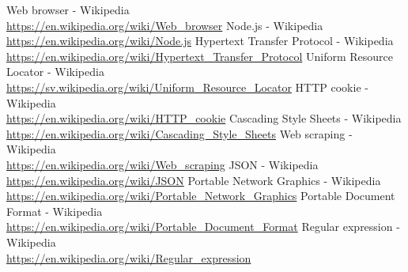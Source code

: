 \documentclass{article}
\begin{document}
	\newpage
	\renewcommand{\bibpreamble}{
		\textit{Because this type of project does not rely on the use of sources as basis for claims, instead discussing empirical observations using technical terms and concepts, little emphasis is put on the sources. In order to provide a reference, where information can be validated and reviewed, Wikipedia is used; the articles listed include all the relevant information. All sources were reviewed at the date of publication of this paper.}
	}
	
	\begin{thebibliography}{9}
		Web browser - Wikipedia\\\url{https://en.wikipedia.org/wiki/Web_browser}
		Node.js - Wikipedia\\\url{https://en.wikipedia.org/wiki/Node.js}
		Hypertext Transfer Protocol - Wikipedia\\\url{https://en.wikipedia.org/wiki/Hypertext_Transfer_Protocol}
		Uniform Resource Locator - Wikipedia\\\url{https://sv.wikipedia.org/wiki/Uniform_Resource_Locator}
		HTTP cookie - Wikipedia\\\url{https://en.wikipedia.org/wiki/HTTP_cookie}
		Cascading Style Sheets - Wikipedia\\\url{https://en.wikipedia.org/wiki/Cascading_Style_Sheets}
		Web scraping - Wikipedia\\\url{https://en.wikipedia.org/wiki/Web_scraping}
		JSON - Wikipedia\\\url{https://en.wikipedia.org/wiki/JSON}
		Portable Network Graphics - Wikipedia\\\url{https://en.wikipedia.org/wiki/Portable_Network_Graphics}
		Portable Document Format - Wikipedia\\\url{https://en.wikipedia.org/wiki/Portable_Document_Format}
		Regular expression - Wikipedia\\\url{https://en.wikipedia.org/wiki/Regular_expression}
	\end{thebibliography}
\end{document}

